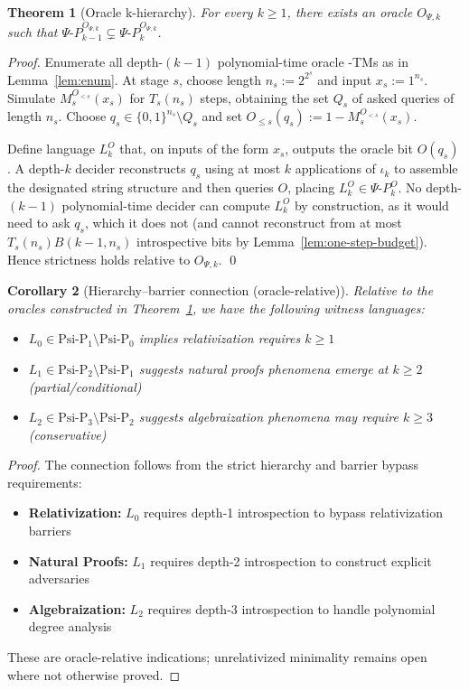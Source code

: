 \documentclass[11pt]{article}
\newtheorem{theorem}{Theorem}[section]
\newtheorem{corollary}[theorem]{Corollary}
\theoremstyle{plain}
\theoremstyle{definition}
\newcommand{\PSi}{\Psi}
\newcommand{\bits}{\{0,1\}}
\begin{document}
\begin{theorem}[Oracle k-hierarchy]
\label{thm:oracle-k-hierarchy}
For every $k\ge1$, there exists an oracle $O_{\PSi,k}$ such that $\Psi\text{-}P_{k-1}^{O_{\PSi,k}} \subsetneq \Psi\text{-}P_{k}^{O_{\PSi,k}}$.
\end{theorem}
\begin{proof}
Enumerate all depth-$(k{-}1)$ polynomial-time oracle \PSi-TMs as in Lemma~\ref{lem:enum}. At stage $s$, choose length $n_s:=2^{2^s}$ and input $x_s:=1^{n_s}$. Simulate $M_s^{O_{<s}}(x_s)$ for $T_s(n_s)$ steps, obtaining the set $Q_s$ of asked queries of length $n_s$. Choose $q_s\in\bits^{n_s}\setminus Q_s$ and set $O_{\le s}(q_s):=1-M_s^{O_{<s}}(x_s)$.

Define language $L_k^{O}$ that, on inputs of the form $x_s$, outputs the oracle bit $O(q_s)$. A depth-$k$ decider reconstructs $q_s$ using at most $k$ applications of $\iota_k$ to assemble the designated string structure and then queries $O$, placing $L_k^{O}\in\Psi\text{-}P_{k}^{O}$. No depth-$(k{-}1)$ polynomial-time decider can compute $L_k^{O}$ by construction, as it would need to ask $q_s$, which it does not (and cannot reconstruct from at most $T_s(n_s) B(k{-}1,n_s)$ introspective bits by Lemma~\ref{lem:one-step-budget}). Hence strictness holds relative to $O_{\PSi,k}$. \qed
\end{proof}

\begin{corollary}[Hierarchy--barrier connection (oracle-relative)]
Relative to the oracles constructed in Theorem~\ref{thm:oracle-k-hierarchy}, we have the following witness languages:
\begin{itemize}
    \item $L_0 \in \text{Psi-P}_1 \setminus \text{Psi-P}_0$ 
          implies relativization requires $k \geq 1$
    \item $L_1 \in \text{Psi-P}_2 \setminus \text{Psi-P}_1$ 
          suggests natural proofs phenomena emerge at $k \geq 2$ (partial/conditional)  
    \item $L_2 \in \text{Psi-P}_3 \setminus \text{Psi-P}_2$ 
          suggests algebraization phenomena may require $k \geq 3$ (conservative)
\end{itemize}
\end{corollary}

\begin{proof}
The connection follows from the strict hierarchy and barrier bypass requirements:
\begin{itemize}
    \item \textbf{Relativization:} $L_0$ requires depth-1 introspection to bypass relativization barriers
    \item \textbf{Natural Proofs:} $L_1$ requires depth-2 introspection to construct explicit adversaries
    \item \textbf{Algebraization:} $L_2$ requires depth-3 introspection to handle polynomial degree analysis
\end{itemize}
These are oracle-relative indications; unrelativized minimality remains open where not otherwise proved.
\end{proof}
\end{document}
